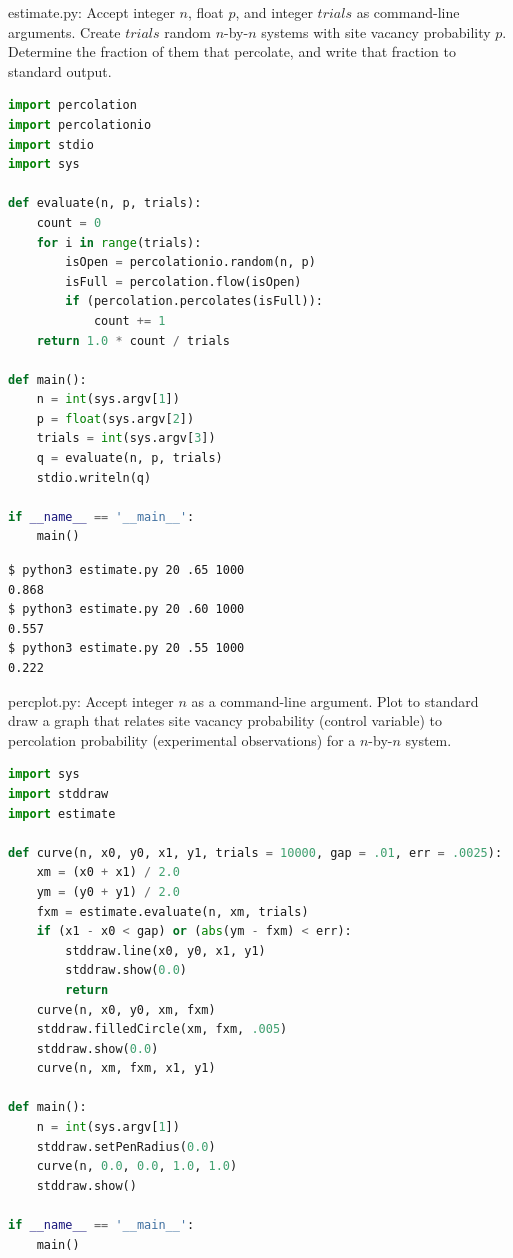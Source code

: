 \documentclass[8pt,a4paper,compress]{beamer}
\begin{document}
\begin{frame}[fragile]
\pause

\begin{framed}
\tiny estimate.py: Accept integer $n$, float $p$, and integer $trials$ as command-line arguments. Create $trials$ random $n$-by-$n$ systems with site vacancy probability $p$. Determine the fraction of them that percolate, and
write that fraction to standard output.
\end{framed}

\begin{lstlisting}[language=Python,style=focusin]
import percolation
import percolationio
import stdio
import sys

def evaluate(n, p, trials):
    count = 0
    for i in range(trials):
        isOpen = percolationio.random(n, p)
        isFull = percolation.flow(isOpen)
        if (percolation.percolates(isFull)):
            count += 1
    return 1.0 * count / trials

def main():
    n = int(sys.argv[1])
    p = float(sys.argv[2])
    trials = int(sys.argv[3])
    q = evaluate(n, p, trials)
    stdio.writeln(q)

if __name__ == '__main__':
    main()
\end{lstlisting}

\pause

\begin{lstlisting}[language={},style=focusin]
$ python3 estimate.py 20 .65 1000
0.868
$ python3 estimate.py 20 .60 1000
0.557
$ python3 estimate.py 20 .55 1000
0.222
\end{lstlisting}
\end{frame}

\begin{frame}[fragile]
\pause

\begin{framed}
\tiny percplot.py:  Accept integer $n$ as a command-line argument. Plot to standard draw a graph that relates site vacancy probability (control variable) to percolation probability (experimental observations) for a $n$-by-$n$ system.
\end{framed}

\begin{lstlisting}[language=Python,style=focusin]
import sys
import stddraw
import estimate

def curve(n, x0, y0, x1, y1, trials = 10000, gap = .01, err = .0025):
    xm = (x0 + x1) / 2.0
    ym = (y0 + y1) / 2.0
    fxm = estimate.evaluate(n, xm, trials)
    if (x1 - x0 < gap) or (abs(ym - fxm) < err):
        stddraw.line(x0, y0, x1, y1)
        stddraw.show(0.0)
        return
    curve(n, x0, y0, xm, fxm)
    stddraw.filledCircle(xm, fxm, .005)
    stddraw.show(0.0)
    curve(n, xm, fxm, x1, y1)
    
def main():
    n = int(sys.argv[1])
    stddraw.setPenRadius(0.0)
    curve(n, 0.0, 0.0, 1.0, 1.0)
    stddraw.show()
    
if __name__ == '__main__':
    main()    
\end{lstlisting}
\end{frame}
\end{document}
